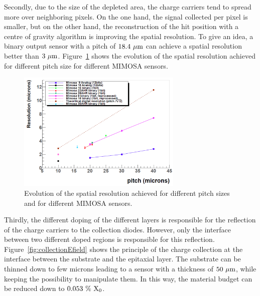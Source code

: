     Secondly, due to the size of the depleted area, the charge carriers tend to spread more over neighboring pixels.
    On the one hand, the signal collected per pixel is smaller, but on the other hand, the reconstruction of the hit position with a centre of gravity algorithm is improving the spatial resolution.
    To give an idea, a binary output sensor with a pitch of $18.4~\rm{\mu m}$ can achieve a spatial resolution better than $3~\rm{\mu m}$.
    Figure~\ref{fig:pitchVsSR} shows the evolution of the spatial resolution achieved for different pitch size for different \gls{MIMOSA} sensors.

    \begin{figure}[!tbh]
      \centering
      \includegraphics[width = 0.7\textwidth]{Pictures/vxd/resolution_pitch_10to40_withBinary.png}
      \caption{Evolution of the spatial resolution achieved for different pitch sizes and for different MIMOSA sensors.}
      \label{fig:pitchVsSR}
    \end{figure}

    Thirdly, the different doping of the different layers is responsible for the reflection of the charge carriers to the collection diodes.
    However, only the interface between two different doped regions is responsible for this reflection.
    Figure~\ref{fig:collectionEfield} shows the principle of the charge collection at the interface between the substrate and the epitaxial layer.
    The substrate can be thinned down to few microns leading to a sensor with a thickness of $50~\rm{\mu m}$, while keeping the possibility to manipulate them.
    In this way, the material budget can be reduced down to $0.053~\%~\rm{X_0}$.

